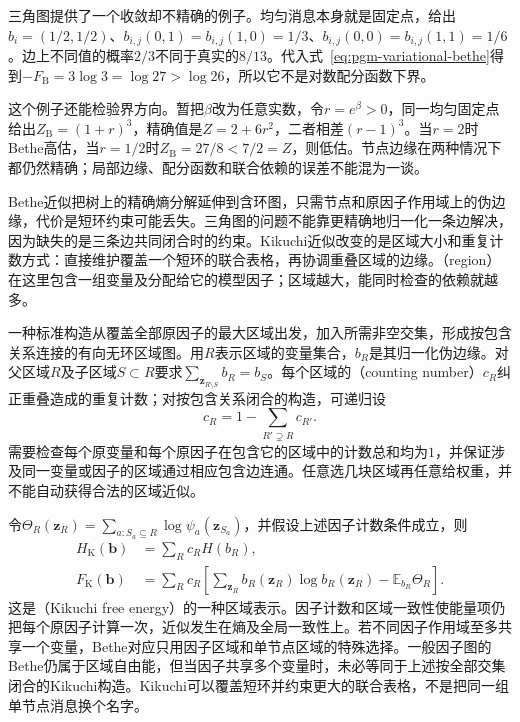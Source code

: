 三角图提供了一个收敛却不精确的例子。均匀消息本身就是固定点，给出$b_i=(1/2,1/2)$、$b_{i,j}(0,1)=b_{i,j}(1,0)=1/3$、$b_{i,j}(0,0)=b_{i,j}(1,1)=1/6$。边上不同值的概率$2/3$不同于真实的$8/13$。代入式~\eqref{eq:pgm-variational-bethe}得到$-F_{\mathrm B}=3\log3=\log27>\log26$，所以它不是对数配分函数下界。

这个例子还能检验界方向。暂把$\beta$改为任意实数，令$r=e^\beta>0$，同一均匀固定点给出$Z_{\mathrm B}=(1+r)^3$，精确值是$Z=2+6r^2$，二者相差$(r-1)^3$。当$r=2$时Bethe高估，当$r=1/2$时$Z_{\mathrm B}=27/8<7/2=Z$，则低估。节点边缘在两种情况下都仍然精确；局部边缘、配分函数和联合依赖的误差不能混为一谈。

\label{sec:pgm-variational-kikuchi}

Bethe近似把树上的精确熵分解延伸到含环图，只需节点和原因子作用域上的伪边缘，代价是短环约束可能丢失。三角图的问题不能靠更精确地归一化一条边解决，因为缺失的是三条边共同闭合时的约束。Kikuchi近似改变的是区域大小和重复计数方式：直接维护覆盖一个短环的联合表格，再协调重叠区域的边缘。（region）在这里包含一组变量及分配给它的模型因子；区域越大，能同时检查的依赖就越多。

一种标准构造从覆盖全部原因子的最大区域出发，加入所需非空交集，形成按包含关系连接的有向无环区域图。用$R$表示区域的变量集合，$b_R$是其归一化伪边缘。对父区域$R$及子区域$S\subset R$要求$\sum_{\bm z_{R\setminus S}}b_R=b_S$。每个区域的（counting number）$c_R$纠正重叠造成的重复计数；对按包含关系闭合的构造，可递归设
\begin{equation}
  c_R=1-\sum_{R'\supsetneq R}c_{R'}.
  \label{eq:pgm-variational-counting}
\end{equation}
需要检查每个原变量和每个原因子在包含它的区域中的计数总和均为$1$，并保证涉及同一变量或因子的区域通过相应包含边连通。任意选几块区域再任意给权重，并不能自动获得合法的区域近似。

令$\Theta_R(\bm z_R)=\sum_{a:S_a\subseteq R}\log\psi_a(\bm z_{S_a})$，并假设上述因子计数条件成立，则
\begin{equation}
  \begin{aligned}
    H_{\mathrm K}(\bm b)&=\sum_R c_R H(b_R),\\
    F_{\mathrm K}(\bm b)
      &=\sum_R c_R\left[
          \sum_{\bm z_R}b_R(\bm z_R)\log b_R(\bm z_R)
          -\mathbb E_{b_R}\Theta_R\right].
  \end{aligned}
  \label{eq:pgm-variational-kikuchi}
\end{equation}
这是（Kikuchi free energy）的一种区域表示。因子计数和区域一致性使能量项仍把每个原因子计算一次，近似发生在熵及全局一致性上。若不同因子作用域至多共享一个变量，Bethe对应只用因子区域和单节点区域的特殊选择。一般因子图的Bethe仍属于区域自由能，但当因子共享多个变量时，未必等同于上述按全部交集闭合的Kikuchi构造。Kikuchi可以覆盖短环并约束更大的联合表格，不是把同一组单节点消息换个名字。

